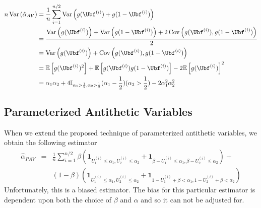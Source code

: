 \documentclass[10pt]{article}
\DeclareMathOperator{\var}{Var}
\DeclareMathOperator{\cov}{Cov}
\begin{document}
\begin{align*}
n\var\left(\hat{\alpha}_{AV}\right) &= \frac{1}{n}\sum_{i=1}^{n/2}\var\left(g(\Ubf^{(i)}) + g(1-\Ubf^{(i)})\right)\\
&=\frac{\var\left(g(\Ubf^{(i)})\right) + \var\left(g(1-\Ubf^{(i)})\right) + 2\cov\left(g(\Ubf^{(i)}),g(1-\Ubf^{(i)})\right)}{2}\\
&=\var\left(g(\Ubf^{(i)})\right) + \cov\left(g(\Ubf^{(i)}),g(1-\Ubf^{(i)})\right)\\
&=\mathbb{E}\left[g(\Ubf^{(i)})^2\right] + \mathbb{E}\left[g(\Ubf^{(i)})g(1-\Ubf^{(i)})\right] - 2\mathbb{E}\left[g(\Ubf^{(i)})\right]^{2}\\
&=\alpha_1\alpha_2+ 4\mathbb{I}_{\alpha_1 > \frac{1}{2},\alpha_2 > \frac{1}{2}}(\alpha_1-\frac{1}{2})(\alpha_2 > \frac{1}{2})-2\alpha_1^{2}\alpha_2^2
\end{align*}

\subsection{Parameterized Antithetic Variables}
When we extend the proposed technique of parameterized antithetic variables, we obtain the following estimator
\begin{align}
\hat{\alpha}_{PAV} & = & \frac{1}{n} \sum_{i=1}^{n/2} \beta \left( \mathbf{1}_{U_{1}^{(i)} \leq \alpha_1,U_{2}^{(i)} \leq \alpha_2} + \mathbf{1}_{\beta-U_{1}^{(i)} \leq \alpha_1,\beta-U_{2}^{(i)} \leq \alpha_2} \right) +\\
&  & (1-\beta) \left( \mathbf{1}_{\bar{U}_{1}^{(i)} \leq \alpha_1,\bar{U}_{2}^{(i)} \leq \alpha_2} + \mathbf{1}_{1-\bar{U}_{1}^{(i)} + \beta < \alpha_1,1-\bar{U}_{2}^{(i)} + \beta < \alpha_2} \right)
\end{align}
Unfortunately, this is a biased estimator. The bias for this particular estimator is dependent upon both the choice of $\beta$ and $\alpha$ and so it can not be adjusted for.

\nocite{*}


\end{document}
